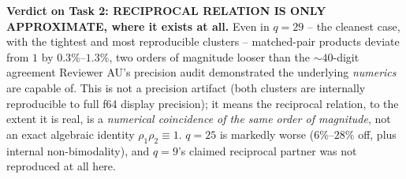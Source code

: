 \textbf{Verdict on Task 2: RECIPROCAL RELATION IS ONLY APPROXIMATE, where it exists at all.} Even
in $q=29$ -- the cleanest case, with the tightest and most reproducible clusters -- matched-pair
products deviate from $1$ by $0.3\%$--$1.3\%$, two orders of magnitude looser than the $\sim40$-digit
agreement Reviewer AU's precision audit demonstrated the underlying \emph{numerics} are capable
of. This is not a precision artifact (both clusters are internally reproducible to full f64
display precision); it means the reciprocal relation, to the extent it is real, is a
\emph{numerical coincidence of the same order of magnitude}, not an exact algebraic identity
$\rho_1\rho_2\equiv1$. $q=25$ is markedly worse ($6\%$--$28\%$ off, plus internal non-bimodality),
and $q=9$'s claimed reciprocal partner was not reproduced at all here.

